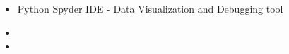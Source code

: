 \begin{itemize}
\item Python Spyder IDE - Data Visualization and Debugging tool
\item 
\item 
\end{itemize}


%
%
%
%
%		
%		
%	
%
%
%
